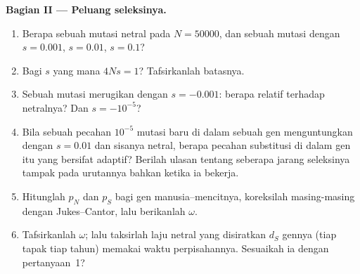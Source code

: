 \begin{problem}
\medskip
\noindent\textbf{Bagian II --- Peluang seleksinya.}
\begin{enumerate}[resume]
  \item Berapa  sebuah mutasi netral pada $N = \num{50000}$,
        dan sebuah mutasi dengan $s = 0.001$, $s = 0.01$, $s = 0.1$?
  \item Bagi $s$ yang mana $4Ns = 1$? Tafsirkanlah batasnya.
  \item Sebuah mutasi merugikan dengan $s = -0.001$: berapa 
        relatif terhadap netralnya? Dan $s = -10^{-5}$?
  \item Bila sebuah pecahan $10^{-5}$ mutasi baru di dalam sebuah gen
        menguntungkan dengan $s = 0.01$ dan sisanya netral, berapa pecahan
        substitusi di dalam gen itu yang bersifat adaptif? Berilah ulasan tentang seberapa
        jarang seleksinya tampak pada urutannya bahkan ketika ia bekerja.
  \item Hitunglah $p_{N}$ dan $p_{S}$ bagi gen manusia--mencitnya, koreksilah
        masing-masing dengan Jukes--Cantor, lalu berikanlah $\omega$.
  \item Tafsirkanlah $\omega$; lalu taksirlah laju netral yang disiratkan
        $d_{S}$ gennya (tiap tapak tiap tahun) memakai waktu perpisahannya. Sesuaikah
        ia dengan pertanyaan~1?
\end{enumerate}


\end{problem}
